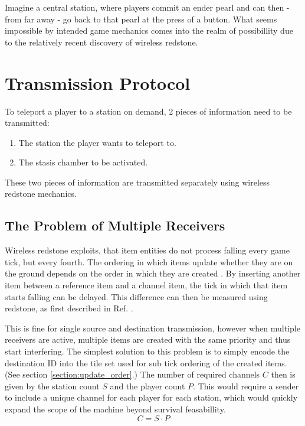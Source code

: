 \documentclass[a4paper,10pt]{article}
\begin{document}
Imagine a central station, where players commit an ender pearl and can then - from far away - go back to that pearl at the press of a button.
What seems impossible by intended game mechanics comes into the realm of possibillity due to the relatively recent discovery of wireless redstone.


\section{Transmission Protocol}

To teleport a player to a station on demand, 2 pieces of information need to be transmitted:
\begin{enumerate}
    \item The station the player wants to teleport to.
    \item The stasis chamber to be activated.
\end{enumerate}

These two pieces of information are transmitted separately using wireless redstone mechanics.


\subsection{The Problem of Multiple Receivers}

Wireless redstone exploits, that item entities do not process falling every game tick, but every fourth.
The ordering in which items update whether they are on the ground depends on the order in which they are created \cite[8:00]{cubicmetre:2022}.
By inserting another item between a reference item and a channel item, the tick in which that item starts falling can be delayed.
This difference can then be measured using redstone, as first described in Ref. \cite{2No2Name:2021}.

This is fine for single source and destination transmission, however when multiple receivers are active, multiple items are created with the same priority and thus start interfering.
The simplest solution to this problem is to simply encode the destination ID into the tile set used for sub tick ordering of the created items. (See section \ref{section:update_order}.) The number of required channels $C$ then is given by the station count $S$ and the player count $P$. 
This would require a sender to include a unique channel for each player for each station, which would quickly expand the scope of the machine beyond survival feasabillity. 
\begin{equation}
    C = S\cdot P
\end{equation}
\end{document}
